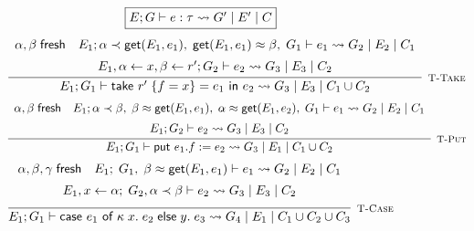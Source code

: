 \begin{figure}
    \centering
    \[
        \fbox{$E; G \vdash e : \tau \rightsquigarrow G'\; |\; E'\; |\; C$}
    \]
    \[
        \infer[\textsc{\footnotesize T-Take}]{
            E_1; G_1
                \vdash \textsf{take } r'\; \{ f = x \} = e_1 \textsf{ in } e_2
                \rightsquigarrow G_3\; |\; E_3\; |\; C_1 \cup C_2
        }{
            \begin{array}{c}
            \alpha, \beta\; \textsf{fresh}
            \hspace{1em}
            E_1; \alpha \tlt \textsf{get}(E_1,e_1),\; \textsf{get}(E_1,e_1) \teq \beta,\; G_1 \vdash e_1
                \rightsquigarrow G_2\; |\; E_2\; |\; C_1 \\[5pt]
            E_1, \alpha \leftarrow x, \beta \leftarrow r'; G_2 \vdash e_2 \rightsquigarrow G_3\; |\; E_3\; |\; C_2
            \end{array}
        }
    \]
    \vspace{0.5pt}
    \[
        \infer[\textsc{\footnotesize T-Put}]{
            E_1; G_1 \vdash \textsf{put } e_1.f := e_2
                \rightsquigarrow G_3\; |\; E_1\; |\; C_1 \cup C_2
        }{
            \begin{array}{c}
                \alpha, \beta\; \textsf{fresh}
                \hspace{1em}
                E_1; \alpha \tlt \beta,\; \beta \teq \textsf{get}(E_1,e_1),\; \alpha \teq \textsf{get}(E_1,e_2),\; 
                    G_1 \vdash e_1 \rightsquigarrow G_2\; |\; E_2\; |\; C_1 \\[5pt]
                E_1; G_2 \vdash e_2 \rightsquigarrow G_3\; |\; E_3\; |\; C_2
            \end{array}
        }
    \]
    \vspace{0.5pt}
    \[
        \infer[\textsc{\footnotesize T-Case}]{
            E_1; G_1 \vdash \textsf{case } e_1 \textsf{ of } \kappa\; x.\; e_2\; 
                \textsf{else}\; y.\; e_3
                \rightsquigarrow G_4\; |\; E_1\; |\; C_1 \cup C_2 \cup C_3
        }{
            \begin{array}{c}
                \alpha, \beta, \gamma\; \textsf{fresh}
                \hspace{1em}
                E_1;\; G_1,\; \beta \teq \textsf{get}(E_1, e_1)  \vdash e_1 
                    \rightsquigarrow G_2\; |\; E_2\; |\; C_1 \\[5pt]
                E_1, x \leftarrow \alpha;\; G_2, \alpha \tlt \beta 
                    \vdash e_2 \rightsquigarrow G_3\; |\; E_3\; |\; C_2 \\[5pt]

\end{array}}\]
\end{figure}
